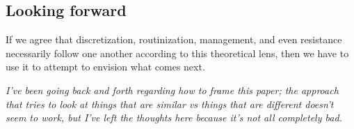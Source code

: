 \documentclass{sigchi}
\begin{document}










\subsection{Looking forward}
If we agree that
discretization,
routinization,
management,
and even resistance
necessarily follow one another according to this theoretical lens,
then we have to use it to attempt to envision
what comes next.



\textit{I've been going back and forth regarding how to frame this paper;
the approach that tries to look at
things that are similar vs things that are different
doesn't seem to work, but
I've left the thoughts here because it's not all completely bad.}
\end{document}
